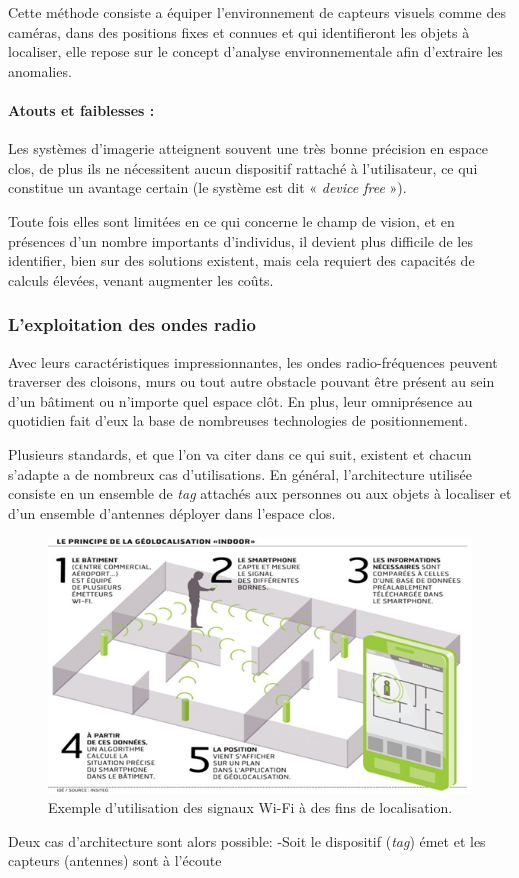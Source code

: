 \documentclass[12pt,a4paper]{report}
\begin{document}
	Cette méthode consiste a équiper l’environnement de capteurs visuels comme des caméras,  dans des positions fixes et connues et qui identifieront les objets à localiser, elle repose sur le concept d’analyse environnementale afin d’extraire les anomalies. 

\paragraph{Atouts et faiblesses :}

Les systèmes d’imagerie atteignent souvent une très bonne précision en espace clos, de plus ils ne nécessitent aucun dispositif rattaché à l’utilisateur, ce qui constitue un avantage certain (le système est dit « \textit{device free} »).

Toute fois elles sont limitées en ce qui concerne le champ de vision, et en présences d’un nombre importants d’individus, il devient plus difficile de les identifier, bien sur  des solutions existent, mais cela requiert des capacités de calculs élevées, venant augmenter les coûts.

\subsubsection{ L’exploitation des ondes radio }

Avec leurs caractéristiques impressionnantes, les ondes radio-fréquences peuvent traverser des cloisons, murs ou tout autre obstacle pouvant être présent au sein d’un bâtiment ou n’importe quel espace clôt. En plus, leur omniprésence au quotidien fait d’eux la base de nombreuses technologies de positionnement.

Plusieurs standards, et que l’on va citer dans ce qui suit, existent et chacun s’adapte a de nombreux cas d’utilisations. En général, l’architecture utilisée consiste en un ensemble de \textit{tag} attachés aux personnes ou aux objets à localiser et d’un ensemble d’antennes déployer dans l’espace clos.

	\begin{figure}[H]
	\centering
	\includegraphics[width=0.8\linewidth]{Pics/indoor.png}
	\caption{Exemple d’utilisation des signaux Wi-Fi à des fins de localisation.}
	\label{fig:indoor}
\end{figure}
	Deux cas d'architecture sont alors possible:
	-Soit le dispositif (\textit{tag}) émet et les capteurs (antennes) sont à l’écoute
	
\end{document}
